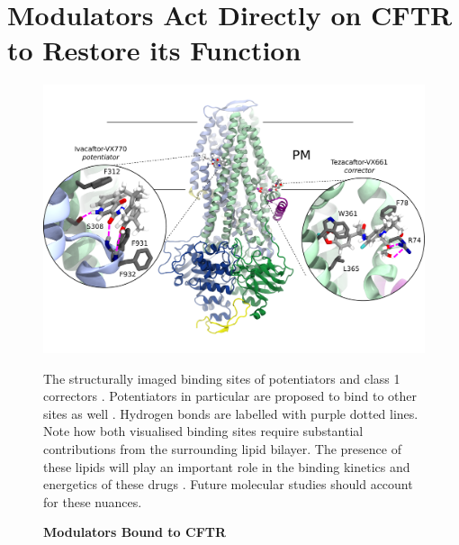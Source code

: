 
\section{Modulators Act Directly on CFTR to Restore its Function}
\begin{figure}
	\label{drugs_bound}
	\begin{center}
		\includegraphics[width=1\textwidth]{figures/drugs_bound_overall.pdf}
	\end{center}
	\captionsetup{singlelinecheck = false, justification=raggedright}
	\caption[Modulators Bound to CFTR] {\textbf{Modulators Bound to CFTR}}{The structurally imaged binding sites of potentiators and class 1 correctors \cite{liu2019, fiedorczuk2022}. Potentiators in particular are proposed to bind to other sites as well \cite{yeh2019, liu2019}. Hydrogen bonds are labelled with purple dotted lines. Note how both visualised binding sites require substantial contributions from the surrounding lipid bilayer. The presence of these lipids will play an important role in the binding kinetics and energetics of these drugs \cite{csanady2019}. Future molecular studies should account for these nuances.} 
\end{figure}

